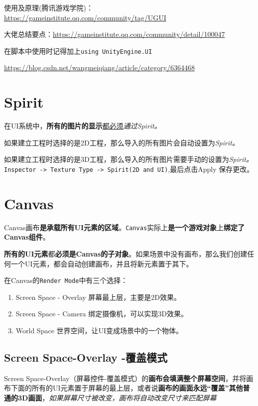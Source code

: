 \documentclass[UTF8,a4paper,12pt]{ctexbook}
\begin{document}
	使用及原理(腾讯游戏学院)：\url{https://gameinstitute.qq.com/community/tag/UGUI}

	大佬总结要点：\url{https://gameinstitute.qq.com/community/detail/100047}
	
	
	在脚本中使用时记得加上\verb|using UnityEngine.UI |
	
	\url{https://blog.csdn.net/wangmeiqiang/article/category/6364468}
	
	\section{Spirit}
		在UI系统中，\textbf{所有的图片的显示}\underline{都必须}\textit{通过Spirit。}
		
		如果建立工程时选择的是2D工程，那么导入的所有图片会自动设置为\textit{Spirit。}
		
		如果建立工程时选择的是3D工程，那么导入的所有图片需要手动的设置为\textit{Spirit。}\verb|Inspector -> Texture Type -> Spirit(2D and UI)|,最后点击Apply 保存更改。
	
	\section{Canvas}
		Canvas画布\textbf{是承载所有UI元素的区域}。\verb|Canvas|实际上\textbf{是一个游戏对象}上\textbf{绑定了Canvas组件}。
		
		\textbf{所有的UI元素}都\textbf{必须是Canvas的子对象}。如果场景中没有画布，那么我们创建任何一个UI元素，都会自动创建画布，并且将新元素置于其下。
		
		在Canvas的\verb|Render Mode|中有三个选择：
			\begin{enumerate}[itemindent = 1em]
				\item Screen Space - Overlay 屏幕最上层，主要是2D效果。
				\item Screen Space - Camera 绑定摄像机，可以实现3D效果。
				\item World Space 世界空间，让UI变成场景中的一个物体。
			\end{enumerate}
	
		\subsection{Screen Space-Overlay -覆盖模式}
			Screen Space-Overlay（屏幕控件-覆盖模式）的\textbf{画布会填满整个屏幕空间}，并将画布下面的所有的UI元素置于屏幕的最上层，或者说\textbf{画布的画面永远“覆盖”其他普通的3D画面}，\textit{如果屏幕尺寸被改变，画布将自动改变尺寸来匹配屏幕}
			
\end{document}
